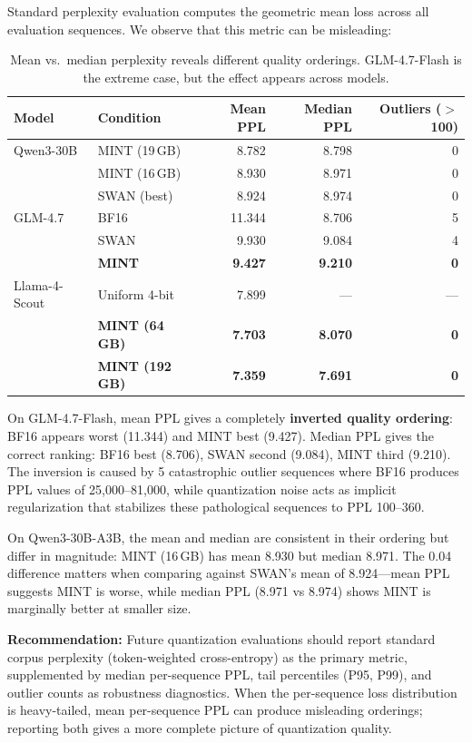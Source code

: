 \documentclass{article}
\begin{document}
Standard perplexity evaluation computes the geometric mean loss across all evaluation sequences. We observe that this metric can be misleading:

\begin{table}[h]
\centering
\caption{Mean vs.\ median perplexity reveals different quality orderings. GLM-4.7-Flash is the extreme case, but the effect appears across models.}
\label{tab:mean_median}
\begin{tabular}{llrrr}
\toprule
Model & Condition & Mean PPL & Median PPL & Outliers ($>$100) \\
\midrule
Qwen3-30B & MINT (19\,GB) & 8.782 & 8.798 & 0 \\
 & MINT (16\,GB) & 8.930 & 8.971 & 0 \\
 & SWAN (best) & 8.924 & 8.974 & 0 \\
\midrule
GLM-4.7 & BF16 & 11.344 & 8.706 & 5 \\
 & SWAN & 9.930 & 9.084 & 4 \\
 & \textbf{MINT} & \textbf{9.427} & \textbf{9.210} & \textbf{0} \\
\midrule
Llama-4-Scout & Uniform 4-bit & 7.899 & --- & --- \\
 & \textbf{MINT (64\,GB)} & \textbf{7.703} & \textbf{8.070} & \textbf{0} \\
 & \textbf{MINT (192\,GB)} & \textbf{7.359} & \textbf{7.691} & \textbf{0} \\
\bottomrule
\end{tabular}
\end{table}

On GLM-4.7-Flash, mean PPL gives a completely \textbf{inverted quality ordering}: BF16 appears worst (11.344) and MINT best (9.427). Median PPL gives the correct ranking: BF16 best (8.706), SWAN second (9.084), MINT third (9.210). The inversion is caused by 5 catastrophic outlier sequences where BF16 produces PPL values of 25{,}000--81{,}000, while quantization noise acts as implicit regularization that stabilizes these pathological sequences to PPL 100--360.

On Qwen3-30B-A3B, the mean and median are consistent in their ordering but differ in magnitude: MINT (16\,GB) has mean 8.930 but median 8.971. The 0.04 difference matters when comparing against SWAN's mean of 8.924---mean PPL suggests MINT is worse, while median PPL (8.971 vs 8.974) shows MINT is marginally better at smaller size.

\textbf{Recommendation:} Future quantization evaluations should report standard corpus perplexity (token-weighted cross-entropy) as the primary metric, supplemented by median per-sequence PPL, tail percentiles (P95, P99), and outlier counts as robustness diagnostics. When the per-sequence loss distribution is heavy-tailed, mean per-sequence PPL can produce misleading orderings; reporting both gives a more complete picture of quantization quality.
\end{document}
